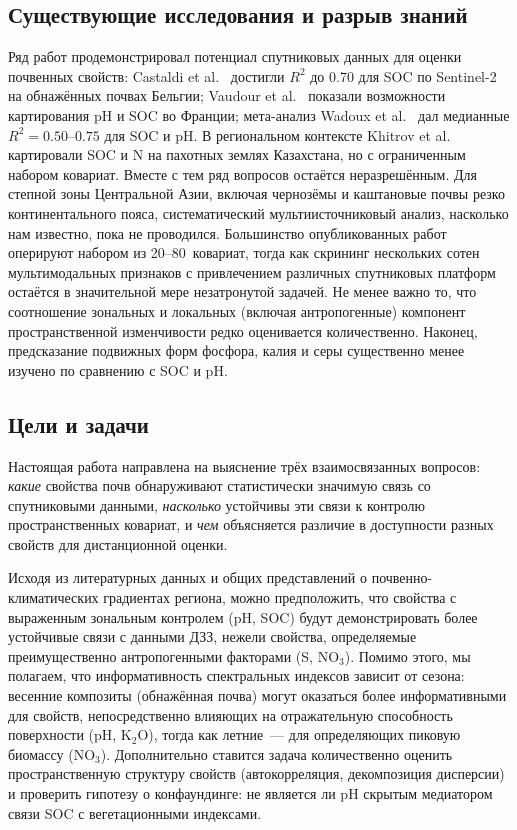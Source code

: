 \subsection{Существующие исследования и разрыв знаний}

Ряд работ продемонстрировал потенциал спутниковых данных для оценки почвенных свойств: Castaldi et al.~\citep{Castaldi2019} достигли $R^2$ до 0.70 для SOC по Sentinel-2 на обнажённых почвах Бельгии; Vaudour et al.~\citep{Vaudour2019} показали возможности картирования pH и SOC во Франции; мета-анализ Wadoux et al.~\citep{Wadoux2020} дал медианные $R^2 = 0.50$--$0.75$ для SOC и pH. В региональном контексте Khitrov et al.~\citep{Khitrov2023} картировали SOC и N на пахотных землях Казахстана, но с ограниченным набором ковариат. Вместе с тем ряд вопросов остаётся неразрешённым. Для степной зоны Центральной Азии, включая чернозёмы и каштановые почвы резко континентального пояса, систематический мультиисточниковый анализ, насколько нам известно, пока не проводился. Большинство опубликованных работ оперируют набором из 20--80~ковариат, тогда как скрининг нескольких сотен мультимодальных признаков с привлечением различных спутниковых платформ остаётся в значительной мере незатронутой задачей. Не менее важно то, что соотношение зональных и локальных (включая антропогенные) компонент пространственной изменчивости редко оценивается количественно. Наконец, предсказание подвижных форм фосфора, калия и серы существенно менее изучено по сравнению с SOC и pH.

\subsection{Цели и задачи}

Настоящая работа направлена на выяснение трёх взаимосвязанных вопросов: \textit{какие} свойства почв обнаруживают статистически значимую связь со спутниковыми данными, \textit{насколько} устойчивы эти связи к контролю пространственных ковариат, и \textit{чем} объясняется различие в доступности разных свойств для дистанционной оценки.

Исходя из литературных данных и общих представлений о почвенно-климатических градиентах региона, можно предположить, что свойства с выраженным зональным контролем (pH, SOC) будут демонстрировать более устойчивые связи с данными ДЗЗ, нежели свойства, определяемые преимущественно антропогенными факторами (S, NO$_3$). Помимо этого, мы полагаем, что информативность спектральных индексов зависит от сезона: весенние композиты (обнажённая почва) могут оказаться более информативными для свойств, непосредственно влияющих на отражательную способность поверхности (pH, K$_2$O), тогда как летние~--- для определяющих пиковую биомассу (NO$_3$). Дополнительно ставится задача количественно оценить пространственную структуру свойств (автокорреляция, декомпозиция дисперсии) и проверить гипотезу о конфаундинге: не является ли pH скрытым медиатором связи SOC с вегетационными индексами.


